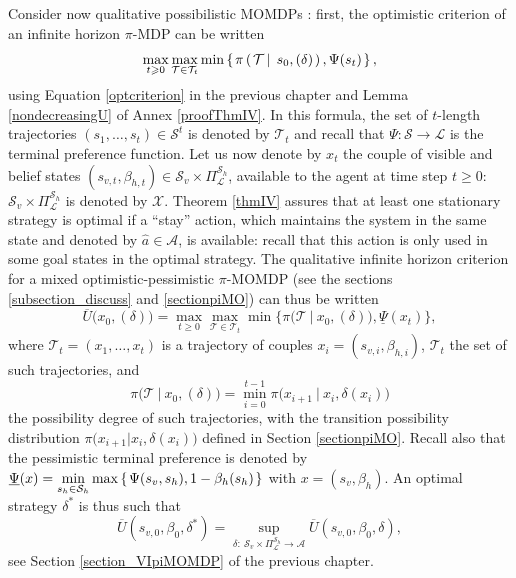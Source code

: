 Consider now qualitative possibilistic MOMDPs \cite{Drougard13}: 
first, the optimistic criterion of an infinite horizon $\pi$-MDP
can be written 
\[ \max_{t \geqslant 0} \max_{\mathcal{T} \in \mathcal{T}_t} \min \left\{ \left.  \pi \left( \left.  \mathcal{T} \, \right| \left. \, s_0, (\delta)   \right. \right) , \Psi(s_t)   \right. \right\}, \]
using Equation \ref{optcriterion} in the previous chapter and Lemma \ref{nondecreasingU} of Annex \ref{proofThmIV}. 
In this formula, the set of $t$-length trajectories $(s_1,\ldots,s_t) \in \mathcal{S}^t$ 
is denoted by $\mathcal{T}_t$ and recall that $\Psi: \mathcal{S} \rightarrow \mathcal{L}$ 
is the terminal preference function.
Let us now denote by $x_t$ the couple of visible and belief states 
$(s_{v,t},\beta_{h,t}) \in \mathcal{S}_v \times \Pi^{\mathcal{S}_h}_{\mathcal{L}}$,
available to the agent at time step $t \geqslant 0$:
$\mathcal{S}_v \times \Pi^{\mathcal{S}_h}_{\mathcal{L}}$ is denoted by $\mathcal{X}$.
Theorem \ref{thmIV} assures that at least one stationary strategy is optimal if a ``stay'' action, 
which maintains the system in the same state and
denoted by $\widehat{a} \in \mathcal{A}$, is available:
recall that this action is only used in some goal states in the optimal strategy. 
The qualitative infinite horizon criterion for a mixed optimistic-pessimistic $\pi$-MOMDP 
(see the sections \ref{subsection_discuss} and \ref{sectionpiMO})
can thus be written
\begin{equation}
\label{probstylerewrittenMOMDPcrit}
\overline{U} \Big( x_0,(\delta) \Big) 
= \max_{t \geqslant 0} \max_{ \mathcal{T} \in \mathcal{T}_t} 
\min \bigg\{ \pi \Big( \mathcal{T} \ \Big\vert \ x_0, (\delta) \Big), \underline{\Psi}(x_t) \bigg\},
\end{equation}
where $\mathcal{T}_t = (x_1,\ldots,x_t)$ is a trajectory of couples $x_i = (s_{v,i}, \beta_{h,i})$,
$\mathcal{T}_{t}$ the set of such trajectories, and 
\[ \pi \Big( \mathcal{T} \ \Big\vert \ x_0, (\delta) \Big) 
= \min_{i=0}^{t - 1} \pi \Big( x_{i+1} \ \Big\vert \ x_i, \delta(x_i)  \Big) \]
the possibility degree of such trajectories,
with the transition possibility distribution 
$\pi \Big( x_{i+1} \Big\vert x_i, \delta(x_i) \Big)$ defined in Section \ref{sectionpiMO}.
Recall also that the pessimistic terminal preference is denoted by $\displaystyle \underline{\Psi}(x) = \min_{s_h \in \mathcal{S}_h} \max \left\{ \left.  \Psi(s_v,s_h), 1 - \beta_h(s_h)  \right. \right\}$
with $x = (s_v,\beta_h)$.
An optimal strategy $\delta^*$ is thus such that
\[ \overline{U}(s_{v,0},\beta_0,\delta^*) = \displaystyle \sup_{\delta: \ \mathcal{S}_v \times \Pi^{\mathcal{S}_h}_{\mathcal{L}} \rightarrow \mathcal{A}} \overline{U}(s_{v,0},\beta_0,\delta), \]
see Section \ref{section_VIpiMOMDP} of the previous chapter.

